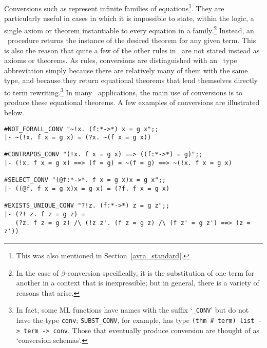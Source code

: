 Conversions such as 
 represent infinite families of
equations\footnote{This was also mentioned
in Section~\ref{avra_standard}.}. They 
are particularly useful in cases in which
it is impossible to state, within the logic,
a single axiom or theorem instantiable
to every equation in a family.\footnote{In the case of
$\beta$-conversion 
specifically, it is the substitution of one term for another in
a context that is inexpressible; but in general,
there is a variety of reasons that arise.} Instead, an \ML\ procedure returns
the instance of the desired theorem for any given term. This is also
the reason that quite a few of the other rules in \HOL\ are not
stated instead as axioms or theorems. As rules, conversions are
distinguished with an \ML\ type abbreviation simply
because there are relatively many of them with the same type,
and because they return equational
theorems that lend themselves directly to term rewriting.\footnote{In
fact, some ML functions have names with the suffix `{\tt \_CONV}'
but do not have the type {\tt conv}; {\tt SUBST\_CONV}, for example,
has type {\tt (thm \# term) list -> term -> conv}. Those that
eventually produce conversion are thought of as `conversion schemas'.} In
many \HOL\ applications, the main use of conversions is to
produce these equational theorems.
A few examples of conversions are illustrated below.

\setcounter{sessioncount}{1}
\begin{session}\begin{verbatim}
#NOT_FORALL_CONV "~!x. (f:*->*) x = g x";;
|- ~(!x. f x = g x) = (?x. ~(f x = g x))

#CONTRAPOS_CONV "(!x. f x = g x) ==> ((f:*->*) = g)";;
|- (!x. f x = g x) ==> (f = g) = ~(f = g) ==> ~(!x. f x = g x)

#SELECT_CONV "(@f:*->*. f x = g x)x = g x";;
|- ((@f. f x = g x)x = g x) = (?f. f x = g x)

#EXISTS_UNIQUE_CONV "?!z. (f:*->*) z = g z";;
|- (?! z. f z = g z) =
   (?z. f z = g z) /\ (!z z'. (f z = g z) /\ (f z' = g z') ==> (z = z'))
\end{verbatim}\end{session}


